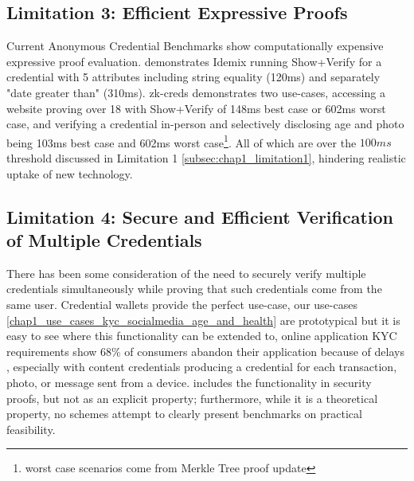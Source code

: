 \subsection{Limitation 3: Efficient Expressive Proofs}
Current Anonymous Credential Benchmarks show computationally expensive expressive proof evaluation. \cite{habib_evaluation_2016} demonstrates Idemix running Show+Verify for a credential with 5 attributes including string equality (120ms) and separately "date greater than" (310ms). zk-creds \cite{rosenberg_zk-creds_2022} demonstrates two use-cases, accessing a website proving over 18 with Show+Verify of 148ms best case or 602ms worst case, and verifying a credential in-person and selectively disclosing age and photo being 103ms best case and 602ms worst case\footnote{worst case scenarios come from Merkle Tree proof update}. All of which are over the $100ms$ threshold discussed in Limitation 1 \ref{subsec:chap1_limitation1}, hindering realistic uptake of new technology. 


\subsection{Limitation 4: Secure and Efficient Verification of Multiple Credentials}
There has been some consideration of the need to securely verify multiple credentials simultaneously while proving that such credentials come from the same user. Credential wallets provide the perfect use-case, our use-cases \ref{chap1_use_cases_kyc_socialmedia_age_and_health} are prototypical but it is easy to see where this functionality can be extended to, online application KYC requirements show 68\% of consumers abandon their application because of delays \cite{signicat_battle_2022}, especially with content credentials \cite{c2paorg_content_2024} producing a credential for each transaction, photo, or message sent from a device. \cite{dunkelman_formal_2016} includes the functionality in security proofs, but not as an explicit property; furthermore, while it is a theoretical property, no schemes attempt to clearly present benchmarks on practical feasibility. 



